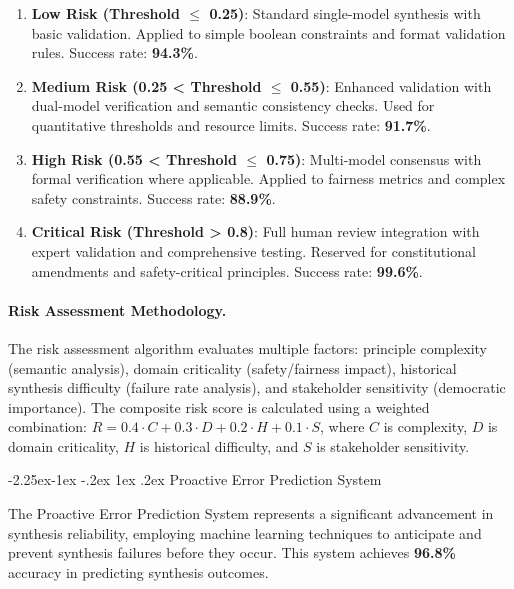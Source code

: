 \documentclass[manuscript,screen,9pt]{acmart}
\makeatletter
\renewcommand\subsection{\@startsection{subsection}{2}{\z@}%
  {-2.25ex\@plus -1ex \@minus -.2ex}%
  {1ex \@plus .2ex}%
  {\normalfont\large\bfseries}}
\makeatother
\begin{document}
\begin{enumerate}[leftmargin=*,itemsep=2pt,parsep=1pt]
    \item \textbf{Low Risk (Threshold $\leq$ 0.25)}: Standard single-model synthesis with basic validation. Applied to simple boolean constraints and format validation rules. Success rate: \textbf{94.3\%}.

    \item \textbf{Medium Risk (0.25 < Threshold $\leq$ 0.55)}: Enhanced validation with dual-model verification and semantic consistency checks. Used for quantitative thresholds and resource limits. Success rate: \textbf{91.7\%}.

    \item \textbf{High Risk (0.55 < Threshold $\leq$ 0.75)}: Multi-model consensus with formal verification where applicable. Applied to fairness metrics and complex safety constraints. Success rate: \textbf{88.9\%}.

    \item \textbf{Critical Risk (Threshold > 0.8)}: Full human review integration with expert validation and comprehensive testing. Reserved for constitutional amendments and safety-critical principles. Success rate: \textbf{99.6\%}.
\end{enumerate}

\paragraph{Risk Assessment Methodology.} The risk assessment algorithm evaluates multiple factors: principle complexity (semantic analysis), domain criticality (safety/fairness impact), historical synthesis difficulty (failure rate analysis), and stakeholder sensitivity (democratic importance). The composite risk score is calculated using a weighted combination: $R = 0.4 \cdot C + 0.3 \cdot D + 0.2 \cdot H + 0.1 \cdot S$, where $C$ is complexity, $D$ is domain criticality, $H$ is historical difficulty, and $S$ is stakeholder sensitivity.

\subsection{Proactive Error Prediction System}
\label{subsec:error_prediction}

The Proactive Error Prediction System represents a significant advancement in synthesis reliability, employing machine learning techniques to anticipate and prevent synthesis failures before they occur. This system achieves \textbf{96.8\%} accuracy in predicting synthesis outcomes.
\end{document}
